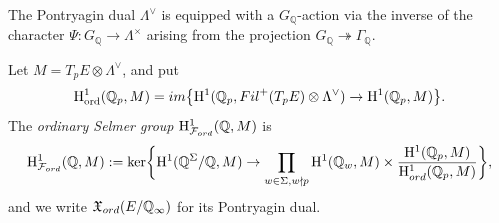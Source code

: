 \documentclass[10pt,reqno]{amsart}
\numberwithin{equation}{section}
\theoremstyle{plain}
\theoremstyle{definition}
\newtheorem{defi}[thm]{Definition}
\theoremstyle{definition}
\theoremstyle{plain}
\theoremstyle{plain}
\theoremstyle{plain}
\theoremstyle{plain}
\theoremstyle{plain}
\theoremstyle{plain}
\DeclareMathOperator{\ord}{ord}
\newcommand{\Q}{\mathbb{Q}}
\newcommand{\X}{\mathfrak{X}}
\newcommand{\Fcal}{\mathcal{F}}
\newcommand{\rH}{\mathrm{H}}
\begin{document}
The Pontryagin dual $\Lambda^{\vee}$ is equipped with a $G_\Q$-action via the inverse of the character $\Psi:G_\Q\rightarrow\Lambda^\times$ arising from the projection $G_\Q\twoheadrightarrow\Gamma_\Q$. 
%
%

Let $M=T_pE\otimes \Lambda^{\vee}$, and put
\[
\rH^1_{\ord}(\Q_p,M)={\rm im}\bigl\{\rH^1(\Q_p,{\rm Fil}^+(T_pE)\otimes \Lambda^{\vee})\rightarrow\rH^1(\Q_p,M)\bigr\}.
\]
The \emph{ordinary Selmer group} $\rH^1_{\Fcal_{\rm ord}}(\Q,M)$ is
\begin{equation}\label{eq:defidiscretecyc}
\rH^1_{\Fcal_{\rm ord}}(\Q,M):=\ker \biggl\{\rH^1(\Q^\Sigma/\Q,M) \to \prod_{w\in\Sigma,w\nmid p}\rH^1(\Q_w,M)\times\frac{\rH^1(\Q_{p},M)}{\rH^1_{\rm ord}(\Q_{p},M)}\biggr\},\nonumber
\end{equation}
and we write $\X_{\rm ord}(E/\Q_{\infty})$ 
for its Pontryagin dual.
%
%
\end{document}
